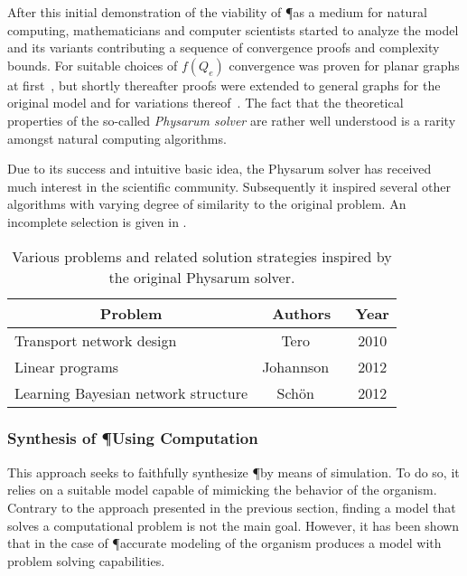 			After this initial demonstration of the viability of \P as a medium for natural computing, mathematicians and computer scientists started to analyze the model and its variants contributing a sequence of convergence proofs and complexity bounds. For suitable choices of $f(Q_e)$ convergence was proven for planar graphs at first~\cite{miyaji2007mathematical,miyaji2008physarum}, but shortly thereafter proofs were extended to general graphs for the original model and for variations thereof~\cite{Bonifaci2012121,bonifaci2013physarum,ito2011convergence,becchetti2013physarum}. The fact that the theoretical properties of the so-called \emph{Physarum solver} are rather well understood is a rarity amongst natural computing algorithms.

			Due to its success and intuitive basic idea, the Physarum solver has received much interest in the scientific community. Subsequently it inspired several other algorithms with varying degree of similarity to the original problem. An incomplete selection is given in . 

			\begin{table}
				\centering
				\begin{tabular}{@{} l *2c @{}}
				\toprule
				 \multicolumn{1}{c}{Problem}    & Authors  & Year   \\ 
				\midrule
				 Transport network design & Tero \etal~\cite{tero2010rules} & 2010 \\
				 Linear programs & Johannson \etal~\cite{Johannson2012} & 2012  \\ 
				 Learning Bayesian network structure & Sch\"on \etal~\cite{schon2012structure} & 2012  \\ 
				\bottomrule
				\end{tabular}
				\caption[Computing inspired by \P]{Various problems and related solution strategies inspired by the original Physarum solver.}
				\label{tab:list_inspired}
			\end{table}

			\FloatBarrier

		\subsubsection{Synthesis of \P Using Computation}

			This approach seeks to faithfully synthesize \P by means of simulation. To do so, it relies on a suitable model capable of mimicking the behavior of the organism. Contrary to the approach presented in the previous section, finding a model that solves a computational problem is not the main goal. However, it has been shown that in the case of \P accurate modeling of the organism produces a model with problem solving capabilities. 


